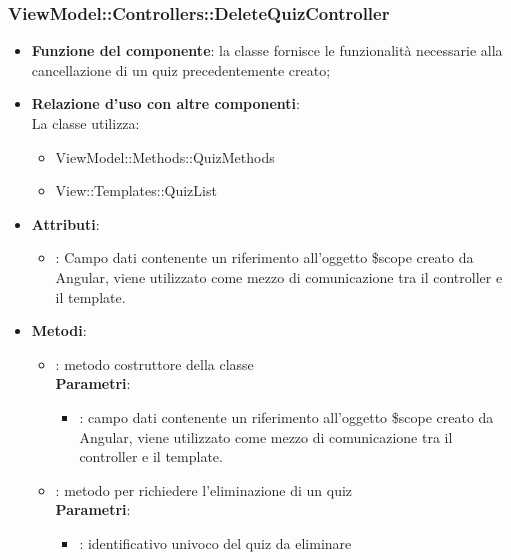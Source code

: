 \subsubsection{ViewModel::Controllers::DeleteQuizController}
\begin{itemize}
\item\textbf{Funzione del componente}: la classe fornisce le funzionalità necessarie alla cancellazione di un quiz precedentemente creato;
	\item\textbf{Relazione d'uso con altre componenti}: \\
La classe utilizza:
	\begin{itemize}
		\item ViewModel::Methods::QuizMethods
		\item View::Templates::QuizList
	\end{itemize}
\item\textbf{Attributi}:
	\begin{itemize}
		\item{}: Campo dati contenente un riferimento all’oggetto \$scope creato da Angular, viene utilizzato come mezzo di comunicazione tra il controller e il template.\\
	\end{itemize}
\item\textbf{Metodi}:
	\begin{itemize}
		\item{}: metodo costruttore della classe\\
		\textbf{Parametri}:
			\begin{itemize}
				\item{}: campo dati contenente un riferimento all’oggetto \$scope creato da Angular, viene utilizzato come mezzo di comunicazione tra il controller e il template.\\
			\end{itemize}
		\item{}:  metodo per richiedere l'eliminazione di un quiz\\
		\textbf{Parametri}:
			\begin{itemize}
				\item{}: identificativo univoco del quiz da eliminare\\
			\end{itemize}
	\end{itemize}
\end{itemize}

